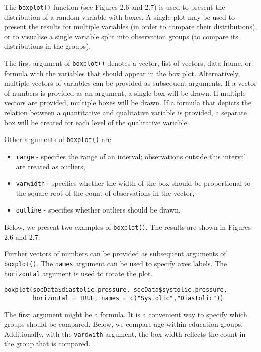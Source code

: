 \documentclass[]{book}
\theoremstyle{definition}
\theoremstyle{definition}
\theoremstyle{definition}
\theoremstyle{remark}
\begin{document}
The \texttt{boxplot()} function (see Figures 2.6 and 2.7) is used to
present the distribution of a random variable with boxes. A single plot
may be used to present the results for multiple variables (in order to
compare their distributions), or to visualise a single variable split
into observation groups (to compare its distributions in the groups).

The first argument of \texttt{boxplot()} denotes a vector, list of
vectors, data frame, or formula with the variables that should appear in
the box plot. Alternatively, multiple vectors of variables can be
provided as subsequent arguments. If a vector of numbers is provided as
an argument, a single box will be drawn. If multiple vectors are
provided, multiple boxes will be drawn. If a formula that depicts the
relation between a quantitative and qualitative variable is provided, a
separate box will be created for each level of the qualitative variable.

Other arguments of \texttt{boxplot()} are:

\begin{itemize}
\item
  \texttt{range} - specifies the range of an interval; observations
  outside this interval are treated as outliers,
\item
  \texttt{varwidth} - specifies whether the width of the box should be
  proportional to the square root of the count of observations in the
  vector,
\item
  \texttt{outline} - specifies whether outliers should be drawn.
\end{itemize}

Below, we present two examples of \texttt{boxplot()}. The results are
shown in Figures 2.6 and 2.7.

Further vectors of numbers can be provided as subsequent arguments of
\texttt{boxplot()}. The \texttt{names} argument can be used to specify
axes labels. The \texttt{horizontal} argument is used to rotate the
plot.

\begin{verbatim}
boxplot(socData$diastolic.pressure, socData$systolic.pressure,
        horizontal = TRUE, names = c("Systolic","Diastolic"))
\end{verbatim}

The first argument might be a formula. It is a convenient way to specify
which groups should be compared. Below, we compare age within education
groups. Additionally, with the \texttt{vardwith} argument, the box width
reflects the count in the group that is compared.
\end{document}
